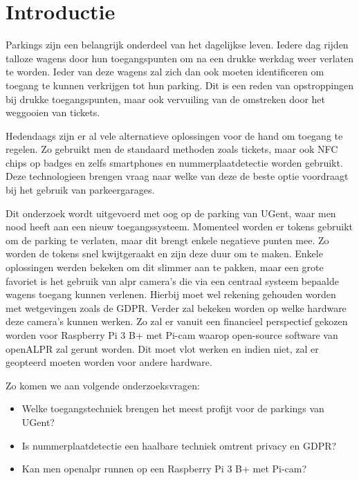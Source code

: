 
\section{Introductie} %
\label{sec:introductie}

Parkings zijn een belangrijk onderdeel van het dagelijkse leven. Iedere dag rijden talloze wagens door hun toegangspunten om na een drukke werkdag weer verlaten te worden. Ieder van deze wagens zal zich dan ook moeten identificeren om toegang te kunnen verkrijgen tot hun parking. Dit is een reden van opstroppingen bij drukke toegangspunten, maar ook vervuiling van de omstreken door het weggooien van tickets.

Hedendaags zijn er al vele alternatieve oplossingen voor de hand om toegang te regelen. Zo gebruikt men de standaard methoden zoals tickets, maar ook NFC chips op badges en zelfs smartphones en nummerplaatdetectie worden gebruikt. Deze technologieen brengen vraag naar welke van deze de beste optie voordraagt bij het gebruik van parkeergarages.

Dit onderzoek wordt uitgevoerd met oog op de parking van UGent, waar men nood heeft aan een nieuw toegangssysteem. Momenteel worden er tokens gebruikt om de parking te verlaten, maar dit brengt enkele negatieve punten mee. Zo worden de tokens snel kwijtgeraakt en zijn deze duur om te maken. Enkele oplossingen werden bekeken om dit slimmer aan te pakken, maar een grote favoriet is het gebruik van alpr camera's die via een centraal systeem bepaalde wagens toegang kunnen verlenen. Hierbij moet wel rekening gehouden worden met wetgevingen zoals de GDPR. Verder zal bekeken worden op welke hardware deze camera's kunnen werken. Zo zal er vanuit een financieel perspectief gekozen worden voor Raspberry Pi 3 B+ met Pi-cam waarop open-source software van openALPR zal gerunt worden. Dit moet vlot werken en indien niet, zal er geopteerd moeten worden voor andere hardware.

Zo komen we aan volgende onderzoeksvragen:
\begin{itemize}
  \item Welke toegangstechniek brengen het meest profijt voor de parkings van UGent?
  \item Is nummerplaatdetectie een haalbare techniek omtrent privacy en GDPR?
  \item Kan men openalpr runnen op een Raspberry Pi 3 B+ met Pi-cam?
\end{itemize}

